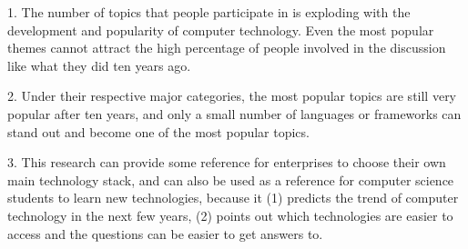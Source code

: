 \documentclass[conference]{IEEEtran}
\begin{document}
1. The number of topics that people participate in is exploding with the development and popularity of computer technology. Even the most popular themes cannot attract the high percentage of people involved in the discussion like what they did ten years ago.
\smallskip\smallskip

2. Under their respective major categories, the most popular topics are still very popular after ten years, and only a small number of languages or frameworks can stand out and become one of the most popular topics.
\smallskip\smallskip

3. This research can provide some reference for enterprises to choose their own main technology stack, and can also be used as a reference for computer science students to learn new technologies, because it (1) predicts the trend of computer technology in the next few years, (2) points out which technologies are easier to access and the questions can be easier to get answers to.




\end{document}
